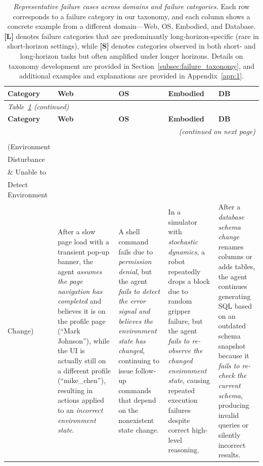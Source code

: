 \documentclass[11pt]{article}
\begin{document}
\begin{longtable}{@{} l p{3cm} p{3cm} p{3cm} p{3cm} @{}}
\caption{\textit{Representative failure cases across domains and failure categories.} Each row corresponds to a failure category in our taxonomy, and each column shows a concrete example from a different domain---Web, OS, Embodied, and Database. \textbf{[L]} denotes failure categories that are predominantly long-horizon-specific (rare in short-horizon settings), while \textbf{[S]} denotes categories observed in both short- and long-horizon tasks but often amplified under longer horizons. Details on taxonomy development are provided in Section~\ref{subsec:failure_taxonomy}, and additional examples and explanations are provided in Appendix~\ref{app:1}.}
\label{tab:failure_tax} \\

\toprule
\textbf{Category} & \textbf{Web} & \textbf{OS} & \textbf{Embodied} & \textbf{DB} \\
\midrule
\endfirsthead

\multicolumn{5}{l}{\textit{Table~\ref{tab:failure_tax} (continued)}} \\
\toprule
\textbf{Category} & \textbf{Web} & \textbf{OS} & \textbf{Embodied} & \textbf{DB} \\
\midrule
\endhead

\midrule
\multicolumn{5}{r}{\textit{(continued on next page)}} \\
\endfoot

\bottomrule
\endlastfoot


\makecell[lt]{\textbf{Environment [S]} \\
(Environment \\ Disturbance \\
\& Unable to \\ Detect Environment \\ Change)}
&   After a slow page load with a transient pop-up banner, the agent \textit{assumes the page navigation has completed} and believes it is on the profile page (``Mark Johnson''), while the UI is actually still on a different profile (``mike\_chen''), resulting in actions applied to an \textit{incorrect environment state}.
&    A shell command fails due to \textit{permission denial}, but the agent \textit{fails to detect the error signal and believes the environment state has changed}, continuing to issue follow-up commands that depend on the nonexistent state change.
&  In a simulator with \textit{stochastic dynamics}, a robot repeatedly drops a block due to random gripper failure, but the agent \textit{fails to re-observe the changed environment state}, causing repeated execution failures despite correct high-level reasoning.
&  After a \textit{database schema change} renames columns or adds tables, the agent continues generating SQL based on an outdated schema snapshot because it \textit{fails to re-check the current schema}, producing invalid queries or silently incorrect results.
\\
\midrule


\end{longtable}
\end{document}
